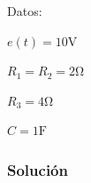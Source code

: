 \documentclass[12pt]{article}
\begin{document}
\begin{minipage}{0.5\linewidth}
\end{minipage}
\begin{minipage}{0.5\linewidth}
  Datos:

  $e(t) = 10\unit{\volt}$
  
  $R_1 = R_2 = 2 \unit{\ohm}$

  $R_3= 4 \unit{\ohm}$

  $C = 1 \unit{\farad}$
\end{minipage}

\subsubsection*{Solución}
\end{document}
